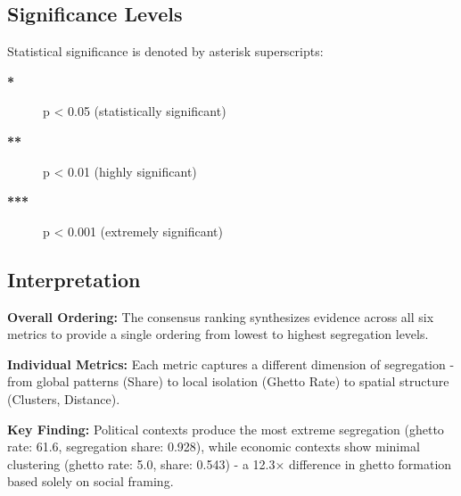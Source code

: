 \subsection*{Significance Levels}

Statistical significance is denoted by asterisk superscripts:

\begin{description}
\item[\textbf{*}] p < 0.05 (statistically significant)
\item[\textbf{**}] p < 0.01 (highly significant)  
\item[\textbf{***}] p < 0.001 (extremely significant)
\end{description}

\subsection*{Interpretation}

\textbf{Overall Ordering:} The consensus ranking synthesizes evidence across all six metrics to provide a single ordering from lowest to highest segregation levels.

\textbf{Individual Metrics:} Each metric captures a different dimension of segregation - from global patterns (Share) to local isolation (Ghetto Rate) to spatial structure (Clusters, Distance). 

\textbf{Key Finding:} Political contexts produce the most extreme segregation (ghetto rate: 61.6, segregation share: 0.928), while economic contexts show minimal clustering (ghetto rate: 5.0, share: 0.543) - a 12.3× difference in ghetto formation based solely on social framing.